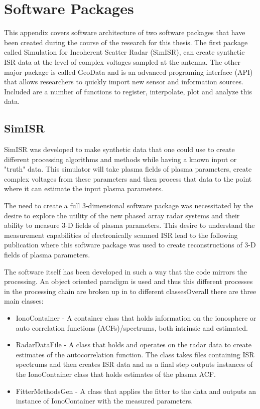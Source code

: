 \chapter{Software Packages}
\label{chapter:appsoft}
\thispagestyle{myheadings}

\graphicspath{{Appendix/Figures/}}


This appendix covers software architecture of two software packages that have been created during the course of the research for this thesis. The first package called Simulation for Incoherent Scatter Radar (SimISR), can create synthetic ISR data at the level of complex voltages sampled at the antenna. The other major package is called GeoData and is an advanced programing interface (API) that allows researchers to quickly import new sensor and information sources. Included are a number of functions to register, interpolate, plot and analyze this data.


\section{SimISR}

 SimISR was developed to make synthetic data that one could use to create different processing algorithms and methods while having a known input or "truth" data. This simulator will take plasma fields of plasma parameters, create complex voltages from these parameters and then process that data to the point where it can estimate the input plasma parameters.

The need to create a full 3-dimensional software package was necessitated by the desire to explore the utility of the new phased array radar systems and their ability to measure 3-D fields of plasma parameters. This desire to understand the measurement capabilities of electronically scanned ISR lead to the following publication \cite{RDS:RDS20236} where this software package was used to create reconstructions of 3-D fields of plasma parameters.

The software itself has been developed in such a way that the code mirrors the processing. An object oriented paradigm is used and thus this different processes in the processing chain are broken up in to different classesOverall there are three main classes: 

\begin{itemize} 
\item IonoContainer - A container class that holds information on the ionosphere or auto correlation functions (ACFs)/spectrums, both intrinsic and estimated.

\item RadarDataFile - A class that holds and operates on the radar data to create estimates of the autocorrelation function. The class takes files containing ISR spectrums and then creates ISR data and as a final step outputs instances of the IonoContainer class that holds estimates of the plasma ACF.

\item FitterMethodsGen - A class that applies the fitter to the data and outputs an instance of IonoContainer with the measured parameters. 
\end{itemize}

